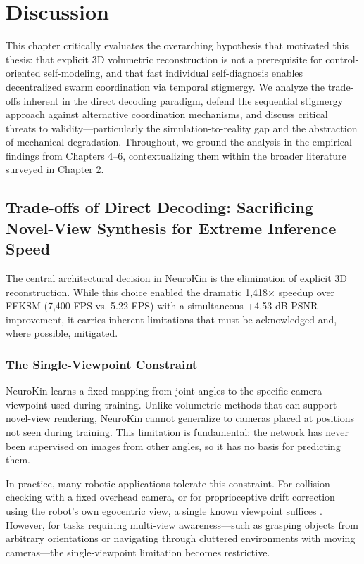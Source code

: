\documentclass[12pt,a4paper,oneside]{report}
\begin{document}
\clearpage

\chapter{Discussion}
\label{chap:discussion_main_ch7}

This chapter critically evaluates the overarching hypothesis that motivated this thesis: that explicit 3D volumetric reconstruction is not a prerequisite for control-oriented self-modeling, and that fast individual self-diagnosis enables decentralized swarm coordination via temporal stigmergy. We analyze the trade-offs inherent in the direct decoding paradigm, defend the sequential stigmergy approach against alternative coordination mechanisms, and discuss critical threats to validity---particularly the simulation-to-reality gap and the abstraction of mechanical degradation. Throughout, we ground the analysis in the empirical findings from Chapters 4--6, contextualizing them within the broader literature surveyed in Chapter 2.

\section{Trade-offs of Direct Decoding: Sacrificing Novel-View Synthesis for Extreme Inference Speed}

The central architectural decision in NeuroKin is the elimination of explicit 3D reconstruction. While this choice enabled the dramatic 1,418$\times$ speedup over FFKSM (7,400 FPS vs. 5.22 FPS) with a simultaneous +4.53 dB PSNR improvement, it carries inherent limitations that must be acknowledged and, where possible, mitigated.

\subsection{The Single-Viewpoint Constraint}

NeuroKin learns a fixed mapping from joint angles to the specific camera viewpoint used during training. Unlike volumetric methods that can support novel-view rendering, NeuroKin cannot generalize to cameras placed at positions not seen during training. This limitation is fundamental: the network has never been supervised on images from other angles, so it has no basis for predicting them.

In practice, many robotic applications tolerate this constraint. For collision checking with a fixed overhead camera, or for proprioceptive drift correction using the robot's own egocentric view, a single known viewpoint suffices \cite{hu2024teaching, chen2022full}. However, for tasks requiring multi-view awareness---such as grasping objects from arbitrary orientations or navigating through cluttered environments with moving cameras---the single-viewpoint limitation becomes restrictive.
\end{document}
